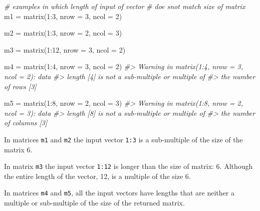 \documentclass[
]{book}
\newenvironment{Shaded}{\begin{snugshade}}{\end{snugshade}}
\newcommand{\AttributeTok}[1]{\textcolor[rgb]{0.77,0.63,0.00}{#1}}
\newcommand{\CommentTok}[1]{\textcolor[rgb]{0.56,0.35,0.01}{\textit{#1}}}
\newcommand{\DecValTok}[1]{\textcolor[rgb]{0.00,0.00,0.81}{#1}}
\newcommand{\FunctionTok}[1]{\textcolor[rgb]{0.00,0.00,0.00}{#1}}
\newcommand{\NormalTok}[1]{#1}
\newcommand{\OtherTok}[1]{\textcolor[rgb]{0.56,0.35,0.01}{#1}}
\newcommand{\SpecialCharTok}[1]{\textcolor[rgb]{0.00,0.00,0.00}{#1}}
\begin{document}
\begin{Shaded}
\begin{Highlighting}[]
\CommentTok{\# examples in which length of input of vector}
\CommentTok{\# doe snot match size of matrix}
\NormalTok{m1 }\OtherTok{=} \FunctionTok{matrix}\NormalTok{(}\DecValTok{1}\SpecialCharTok{:}\DecValTok{3}\NormalTok{, }\AttributeTok{nrow =} \DecValTok{3}\NormalTok{, }\AttributeTok{ncol =} \DecValTok{2}\NormalTok{)}

\NormalTok{m2 }\OtherTok{=} \FunctionTok{matrix}\NormalTok{(}\DecValTok{1}\SpecialCharTok{:}\DecValTok{3}\NormalTok{, }\AttributeTok{nrow =} \DecValTok{2}\NormalTok{, }\AttributeTok{ncol =} \DecValTok{3}\NormalTok{)}

\NormalTok{m3 }\OtherTok{=} \FunctionTok{matrix}\NormalTok{(}\DecValTok{1}\SpecialCharTok{:}\DecValTok{12}\NormalTok{, }\AttributeTok{nrow =} \DecValTok{3}\NormalTok{, }\AttributeTok{ncol =} \DecValTok{2}\NormalTok{)}

\NormalTok{m4 }\OtherTok{=} \FunctionTok{matrix}\NormalTok{(}\DecValTok{1}\SpecialCharTok{:}\DecValTok{4}\NormalTok{, }\AttributeTok{nrow =} \DecValTok{3}\NormalTok{, }\AttributeTok{ncol =} \DecValTok{2}\NormalTok{)}
\CommentTok{\#\textgreater{} Warning in matrix(1:4, nrow = 3, ncol = 2): data}
\CommentTok{\#\textgreater{} length [4] is not a sub{-}multiple or multiple of}
\CommentTok{\#\textgreater{} the number of rows [3]}

\NormalTok{m5 }\OtherTok{=} \FunctionTok{matrix}\NormalTok{(}\DecValTok{1}\SpecialCharTok{:}\DecValTok{8}\NormalTok{, }\AttributeTok{nrow =} \DecValTok{2}\NormalTok{, }\AttributeTok{ncol =} \DecValTok{3}\NormalTok{)}
\CommentTok{\#\textgreater{} Warning in matrix(1:8, nrow = 2, ncol = 3): data}
\CommentTok{\#\textgreater{} length [8] is not a sub{-}multiple or multiple of}
\CommentTok{\#\textgreater{} the number of columns [3]}
\end{Highlighting}
\end{Shaded}

In matrices \texttt{m1} and \texttt{m2} the input vector \texttt{1:3} is a sub-multiple of the size
of the matrix 6.

In matrix \texttt{m3} the input vector \texttt{1:12} is longer than the size of matrix: 6.
Although the entire length of the vector, 12, is a multiple of the size 6.

In matrices \texttt{m4} and \texttt{m5}, all the input vectors have lengths that are
neither a multiple or sub-multiple of the size of the returned matrix.
\end{document}

